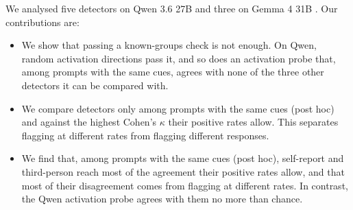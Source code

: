 We analysed five detectors on Qwen 3.6 27B and three on Gemma 4 31B
\citep{qwenteam2026qwen36,gemmateam2026gemma4}. Our contributions are:
\begin{itemize}
  \item We show that passing a known-groups check is not enough. On Qwen, random activation
  directions pass it, and so does an activation probe that, among prompts with the same cues, agrees
  with none of the three other detectors it can be compared with.
  \item We compare detectors only among prompts with the same cues (post hoc) and against the
  highest Cohen's $\kappa$ their positive rates allow. This separates flagging at different rates from
  flagging different responses.
  \item We find that, among prompts with the same cues (post hoc), self-report and
  third-person reach most of the agreement their positive rates allow, and that most of their
  disagreement comes from flagging at different rates. In contrast, the Qwen activation probe
  agrees with them no more than chance.
\end{itemize}
